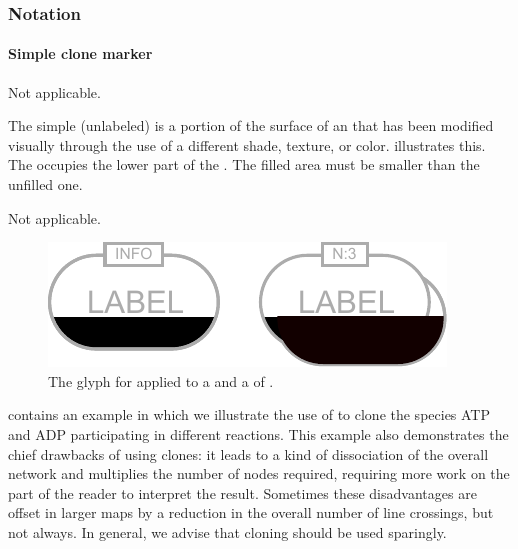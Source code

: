 \begin{valrules}
\end{valrules}


\subsubsection{Notation}

\paragraph{Simple clone marker}

\begin{glyphDescription}

\glyphSboTerm Not applicable.

\glyphContainer The simple (unlabeled)  is a
portion of the surface of an  that has been modified
visually through the use of a different shade, texture, or color.
 illustrates this.  The 
occupies the lower part of the . The filled area must be
smaller than the unfilled one.

\glyphLabel Not applicable.

\end{glyphDescription}

\begin{figure}[htb]
  \centering
  \includegraphics[scale = 0.3]{images/simpleCloneMarker}
  \caption{The \PD glyph for  applied to a  and a  of .}
  \label{fig:techref:simpleCloneMarker}
\end{figure}

 contains an example in which we illustrate the use of  to clone the species ATP and ADP participating in different reactions.  This example also demonstrates the chief drawbacks of using clones: it leads to a kind of dissociation of the overall network and multiplies the number of nodes required, requiring more work on the part of the reader to interpret the result.  Sometimes these disadvantages are offset in larger maps by a reduction in the overall number of line crossings, but not always.  In general, we advise that cloning should be used sparingly.

